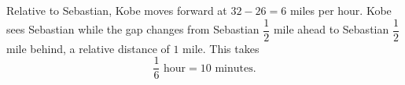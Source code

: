 Relative to Sebastian, Kobe moves forward at $32-26=6$ miles per hour. Kobe sees Sebastian while the gap changes from Sebastian $\dfrac{1}{2}$ mile ahead to Sebastian $\dfrac{1}{2}$ mile behind, a relative distance of $1$ mile. This takes
\[
\dfrac{1}{6}\text{ hour}=\boxed{10}\text{ minutes}.
\]
